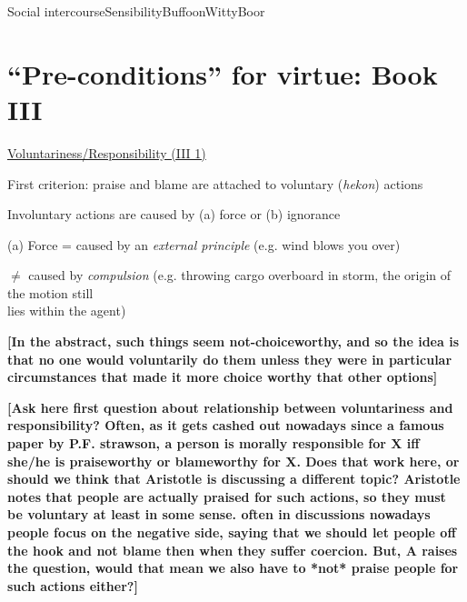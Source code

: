 \documentclass[11pt]{article}
\begin{document}
\noindent Social intercourse\hspace*{6mm}Sensibility\hspace*{18mm}Buffoon\hspace*{16mm}Witty\hspace*{21mm}Boor

\section*{``Pre-conditions'' for virtue: Book III}

\noindent\underline{Voluntariness/Responsibility (III 1)}
\vspace*{2mm}

\noindent [1] First criterion: praise and blame are attached to voluntary (\emph{hekon}) actions
\vspace*{1mm}

\noindent [2] Involuntary actions are caused by (a) force or (b) ignorance
\vspace*{1mm}

(a) Force = caused by an \emph{external principle} (e.g. wind blows you over)
\vspace*{1mm}

\hspace*{14.5mm}$\neq$ caused by \emph{compulsion} (e.g. throwing cargo overboard in storm, the origin of the motion still\\\hspace*{23mm} lies within the agent)
\vspace*{1mm}

\noindent\textbf{[In the abstract, such things seem not-choiceworthy, and so the idea is that no one would voluntarily do them unless they were in particular circumstances that made it more choice worthy that other options]}
\vspace*{2mm}

\noindent\textbf{[Ask here first question about relationship between voluntariness and responsibility? Often, as it gets cashed out nowadays since a famous paper by P.F. strawson, a person is morally responsible for X iff she/he is praiseworthy or blameworthy for X. Does that work here, or should we think that Aristotle is discussing a different topic? Aristotle notes that people are actually praised for such actions, so they must be voluntary at least in some sense. often in discussions nowadays people focus on the negative side, saying that we should let people off the hook and not blame then when they suffer coercion. But, A raises the question, would that mean we also have to *not* praise people for such actions either?]}
\vspace*{1mm}
\end{document}
